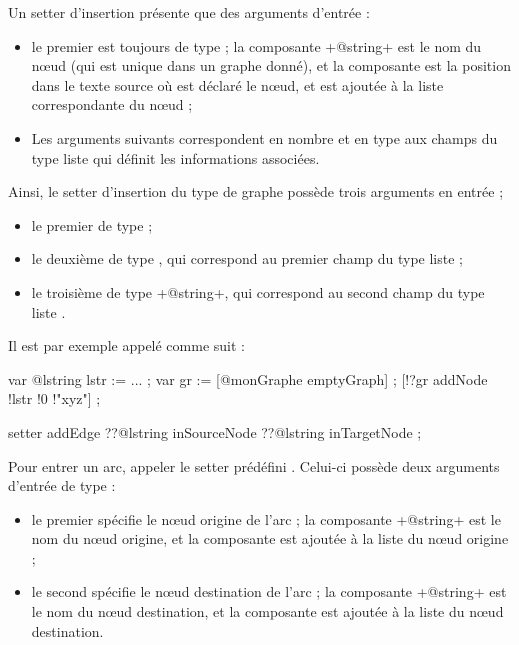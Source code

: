 Un setter d'insertion présente que des arguments d'entrée :
\begin{itemize}
  \item le premier est toujours de type  ; la composante \ggs+@string+ est le nom du nœud (qui est unique dans un graphe donné), et la composante  est la position dans le texte source où est déclaré le nœud, et est ajoutée à la liste correspondante du nœud ;
  \item Les arguments suivants correspondent en nombre et en type aux champs du type liste qui définit les informations associées.
\end{itemize}

Ainsi, le setter d'insertion  du type de graphe  possède trois arguments en entrée ;
\begin{itemize}
  \item le premier de type  ;
  \item le deuxième de type , qui correspond au premier champ  du type liste  ;
  \item le troisième de type \ggs+@string+, qui correspond au second champ  du type liste .
\end{itemize}

Il est par exemple appelé comme suit :
\begin{galgascode}
var @lstring lstr := ... ;
var gr := [@monGraphe emptyGraph] ;
[!?gr addNode !lstr !0 !"xyz"] ;
\end{galgascode}





\begin{galgascode}
setter addEdge ??@lstring inSourceNode ??@lstring inTargetNode ;
\end{galgascode}

Pour entrer un arc, appeler le setter prédéfini . Celui-ci possède deux arguments d'entrée de type  :
\begin{itemize}
  \item le premier spécifie le nœud origine de l'arc ; la composante \ggs+@string+ est le nom du nœud origine, et la composante  est ajoutée à la liste du nœud origine ;
  \item le second spécifie le nœud destination de l'arc ; la composante \ggs+@string+ est le nom du nœud destination, et la composante  est ajoutée à la liste du nœud destination.
\end{itemize}







